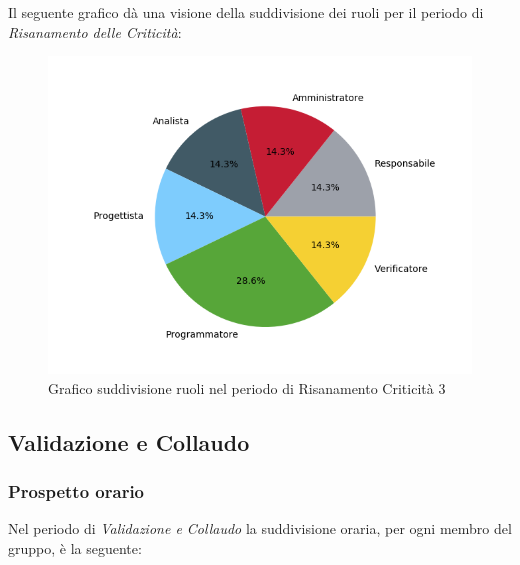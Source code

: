 Il seguente grafico dà una visione della suddivisione dei ruoli per il periodo di  \textit{Risanamento delle Criticità}:\begin{figure}[H]
	\centering
	\includegraphics[width=1\linewidth]{./images/torta_rc3.png}
	\caption{Grafico suddivisione ruoli nel periodo di Risanamento Criticità 3}
	\label{fig:grafico suddivione ruoli rc3}
\end{figure}

\newpage

\subsection{Validazione e Collaudo}
\label{PVC}
\subsubsection{Prospetto orario}
Nel periodo di \textit{Validazione e Collaudo} la suddivisione oraria, per ogni membro del gruppo, è la seguente:

